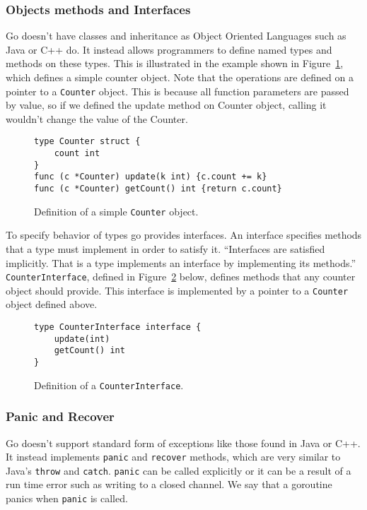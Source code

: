 \subsubsection{Objects methods and Interfaces}
Go doesn't have classes and inheritance as Object Oriented Languages 
such as Java or C++ do. It instead allows programmers to define named types
and methods on these types. This is illustrated in the example shown in 
Figure~\ref{fig:counterObj}, which defines a simple counter object.
Note that the operations are defined on a pointer to a \texttt{Counter}
object. This is because all function parameters are passed by value, so
if we defined the update method on Counter object, calling it wouldn't
change the value of the Counter.

\begin{figure}[h]
\centering
\begin{lstlisting}
type Counter struct {
    count int
}
func (c *Counter) update(k int) {c.count += k}
func (c *Counter) getCount() int {return c.count}
\end{lstlisting}
\caption[scale=1.0]{Definition of a simple \texttt{Counter} object.}
\label{fig:counterObj}
\end{figure}

To specify behavior of types go provides interfaces. An interface
specifies methods that a type must implement in order to satisfy it.
``Interfaces are satisfied implicitly. That is a type implements 
an interface by implementing its methods.''~\cite{tour}
\texttt{CounterInterface}, defined in Figure~\ref{fig:counterInter} below,
defines methods that any counter object should provide. This interface 
is implemented by a pointer to a \texttt{Counter} object defined above.

\begin{figure}[h]
\centering
\begin{lstlisting}
type CounterInterface interface {
    update(int)
    getCount() int
}
\end{lstlisting}
\caption[scale=1.0]{Definition of a \texttt{CounterInterface}.}
\label{fig:counterInter}
\end{figure}

\subsubsection{Panic and Recover}
Go doesn't support standard form of exceptions like those found in Java or
C++. It instead implements \texttt{panic} and \texttt{recover} methods, 
which are very similar to Java's \texttt{throw} and \texttt{catch}.
\texttt{panic} can be called explicitly or it can be a result of 
a run time error such as writing to a closed channel. We say that 
a goroutine panics when \texttt{panic} is called.

